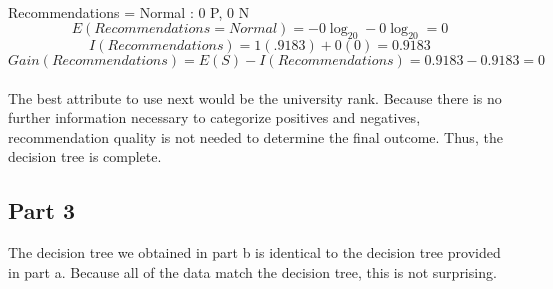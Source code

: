 \documentclass[12pt]{article}
\begin{document}
\\
Recommendations = Normal : 0 P, 0 N
\begin{equation}
E(Recommendations = Normal) = -0\log_20-0\log_20 = 0
\end{equation}
\begin{equation}
I(Recommendations) = 1(.9183)+0(0) = 0.9183
\end{equation}
\begin{equation}
Gain(Recommendations) = E(S) - I(Recommendations) = 0.9183 - 0.9183 = 0
\end{equation}
\\
The best attribute to use next would be the university rank. Because there is no further information necessary to categorize positives and negatives, recommendation quality is not needed to determine the final outcome. Thus, the decision tree is complete.

\subsection*{Part 3}

The decision tree we obtained in part b is identical to the decision tree provided in part a. Because all of the data match the decision tree, this is not surprising.
\end{document}
